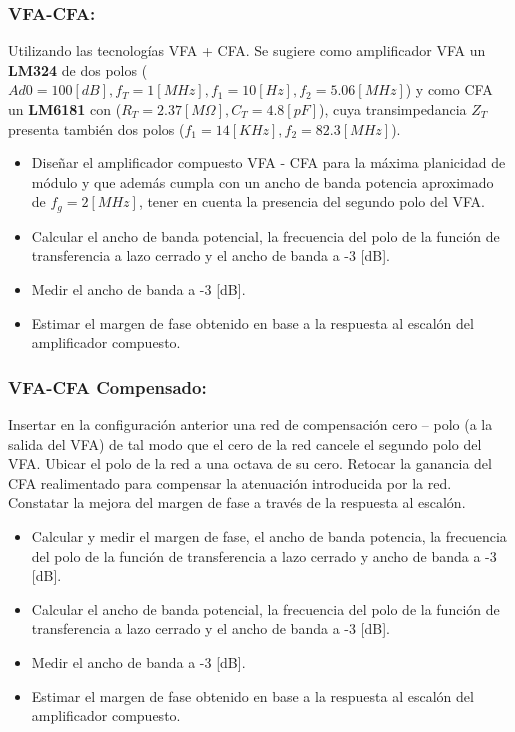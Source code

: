 \subsubsection{VFA-CFA:}
 Utilizando las tecnologías VFA + CFA. Se sugiere como amplificador VFA un \textbf{LM324} de dos polos ($Ad0 = 100 [dB], f_T = 1 [MHz], f_1 = 10[Hz], f_2 = 5.06 [MHz]$) y como CFA un \textbf{LM6181} con ($R_T= 2.37 [M\Omega], C_T = 4.8 [pF]$), cuya transimpedancia $Z_T$ presenta también dos polos ($f_1 = 14 [KHz], f_2 = 82.3 [MHz]$).\\
 
 \begin{itemize}
     \item Diseñar el amplificador compuesto VFA - CFA para la máxima planicidad de módulo y que además cumpla con un ancho de banda potencia aproximado de $f_g = 2 [MHz]$, tener en cuenta la presencia del segundo polo del VFA.
     \item Calcular el ancho de banda potencial, la frecuencia del polo de la función de transferencia a lazo cerrado y el ancho de banda a -3 [dB].
     \item Medir el ancho de banda a -3 [dB].
     \item Estimar el margen de fase obtenido en base a la respuesta al escalón del amplificador compuesto.
 \end{itemize}


\subsubsection{VFA-CFA Compensado:}
Insertar en la configuración anterior una red de compensación cero – polo (a la salida del VFA) de tal modo que el cero de la red cancele el segundo polo del VFA. Ubicar el polo de la red a una octava de su cero. Retocar la ganancia del CFA realimentado para compensar la atenuación introducida por la red. Constatar la mejora del margen de fase a través de la respuesta al escalón.
 
 \begin{itemize}
     \item Calcular y medir el margen de fase, el ancho de banda potencia, la frecuencia del polo de la función de transferencia a lazo cerrado y ancho de banda a -3 [dB].
     \item Calcular el ancho de banda potencial, la frecuencia del polo de la función de transferencia a lazo cerrado y el ancho de banda a -3 [dB].
     \item Medir el ancho de banda a -3 [dB].
     \item Estimar el margen de fase obtenido en base a la respuesta al escalón del amplificador compuesto.
 \end{itemize}

